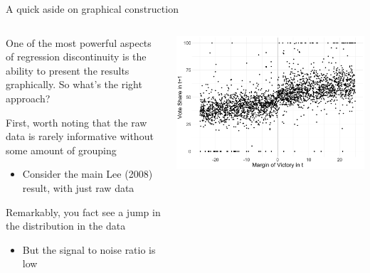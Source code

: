 \documentclass[notes,11pt, aspectratio=169]{beamer}
\newenvironment{wideitemize}{\itemize\addtolength{\itemsep}{10pt}}{\enditemize}
\begin{document}
\begin{frame}{A quick aside on graphical construction}
  \begin{columns}[onlytextwidth, T] %
    \begin{column}{.5\textwidth}
      \begin{wideitemize}
      \item One of the most powerful aspects of regression
        discontinuity is the ability to present the results
        graphically. So what's the right approach?
      \item First, worth noting that the raw data is rarely informative without some amount of grouping
        \begin{itemize}
        \item Consider the main Lee (2008) result, with just raw data
        \end{itemize}
      \item Remarkably, you fact see a jump in the distribution in the data
        \begin{itemize}
        \item But the signal to noise ratio is low
        \end{itemize}
      \end{wideitemize}
    \end{column}%
    \hfill%
    \begin{column}{.5\textwidth}
      \includegraphics[width=\linewidth]{images/lee_rd_scatter.png}
    \end{column}%
  \end{columns}
\end{frame}
\end{document}
